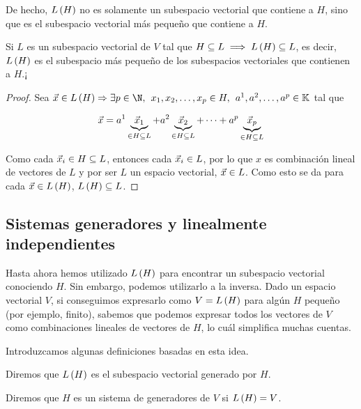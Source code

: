 \documentclass[../algebra_lineal.tex]{subfiles}
\begin{document}
De hecho, $L\left(H\right)$ no es solamente un subespacio vectorial que contiene a $H$, sino que es el subespacio vectorial más pequeño que contiene a $H$. 

\begin{proposition}
    Si $L$ es un subespacio vectorial de $V$ tal que $H \subseteq L \implies L\left(H\right) \subseteq L$, es decir, $L\left(H\right)$ es el subespacio más pequeño de los subespacios vectoriales que contienen a $H$.¡
\end{proposition}

\begin{proof}
Sea $\vx \in \lspan{H} \Rightarrow \exists p \in \N, \spc \dlst{x}{p} \in H, \spc \ulst{a}{p} \in \K$ tal que 

\[ \vec{x} = a^1 \underbrace{\vec{x}_1}_{\in H \subseteq L} +  a^2\underbrace{\vec{x}_2}_{\in H \subseteq L} + \dots +  a^p \underbrace{\vec{x}_p}_{\in H \subseteq L} \]

Como cada $\vec{x}_i \in H \subseteq L$, entonces cada $\vec{x}_i \in L$, por lo que $x$ es combinación lineal de vectores de $L$ y por ser $L$ un espacio vectorial, $\vec{x} \in L$. Como esto se da para cada $\vec{x} \in L\left(H\right)$, $L\left(H\right) \subseteq L$.
\end{proof}

\subsection{Sistemas generadores y linealmente independientes}

Hasta ahora hemos utilizado $L\left(H\right)$ para encontrar un subespacio vectorial conociendo $H$. Sin embargo, podemos utilizarlo a la inversa. Dado un espacio vectorial $V$, si conseguimos expresarlo como $V=L\left(H\right)$ para algún $H$ pequeño (por ejemplo, finito), sabemos que podemos expresar todos los vectores de $V$ como combinaciones lineales de vectores de $H$, lo cuál simplifica muchas cuentas.

Introduzcamos algunas definiciones basadas en esta idea.

\begin{definition}
    Diremos que $L\left(H\right)$ es el subespacio vectorial generado por $H$.
\end{definition}

\begin{definition}
    Diremos que $H$ es un sistema de generadores de $V$ si $L\left(H\right) = V$.
\end{definition}
\end{document}
